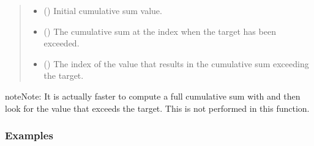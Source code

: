 \documentclass[letterpaper,10pt,english]{sphinxmanual}
\begin{document}
\begin{fulllineitems}
\begin{quote}
\begin{description}
\begin{itemize}
\item {}
\sphinxAtStartPar
{} () \textendash{} Initial cumulative sum value.

\end{itemize}

\sphinxAtStartPar
{}

\sphinxAtStartPar
\begin{itemize}
\item {}
\sphinxAtStartPar
{} () \textendash{} The cumulative sum at the index when the target has been exceeded.

\item {}
\sphinxAtStartPar
{} () \textendash{} The index of the value that results in the cumulative sum exceeding
the target.

\end{itemize}


\end{description}\end{quote}

\begin{sphinxadmonition}{note}{Note:}
\sphinxAtStartPar
It is actually faster to compute a full cumulative sum with  and
then look for the value that exceeds the target. This is not performed in
this function.
\end{sphinxadmonition}
\subsubsection*{Examples}

\begin{sphinxVerbatim}[commandchars=\\\{\}]
  
  
 
\end{sphinxVerbatim}

\end{fulllineitems}
\end{document}
